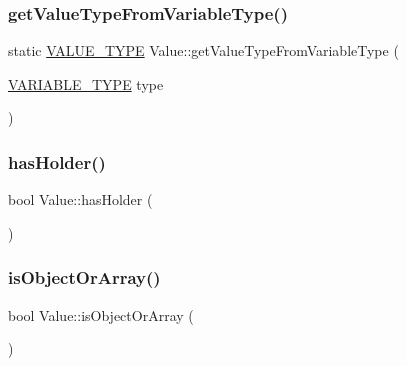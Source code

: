 \mbox{\label{classValue_a0fcd69a505d407d2cc8e3095499a9516}} 
\subsubsection{\texorpdfstring{get\+Value\+Type\+From\+Variable\+Type()}{getValueTypeFromVariableType()}}
{\footnotesize\ttfamily static \hyperlink{statics_8h_a0674a913b8e8c8a9f265baab3646b565}{V\+A\+L\+U\+E\+\_\+\+T\+Y\+PE} Value\+::get\+Value\+Type\+From\+Variable\+Type (\begin{DoxyParamCaption}\item[{\hyperlink{statics_8h_a4c85b3a98d55cc0252806c950379cce0}{V\+A\+R\+I\+A\+B\+L\+E\+\_\+\+T\+Y\+PE}}]{type }\end{DoxyParamCaption})\hspace{0.3cm}{\ttfamily [static]}}

\mbox{\label{classValue_a9193333ebda6a44b426ebc24519473db}} 
\subsubsection{\texorpdfstring{has\+Holder()}{hasHolder()}}
{\footnotesize\ttfamily bool Value\+::has\+Holder (\begin{DoxyParamCaption}{ }\end{DoxyParamCaption})}

\mbox{\label{classValue_a37e1fe6c86dc755a3e000442c4949ab7}} 
\subsubsection{\texorpdfstring{is\+Object\+Or\+Array()}{isObjectOrArray()}}
{\footnotesize\ttfamily bool Value\+::is\+Object\+Or\+Array (\begin{DoxyParamCaption}{ }\end{DoxyParamCaption})}

\mbox{\label{classValue_a8550d0a2396c3222421fdd1aef7ff49b}} 

